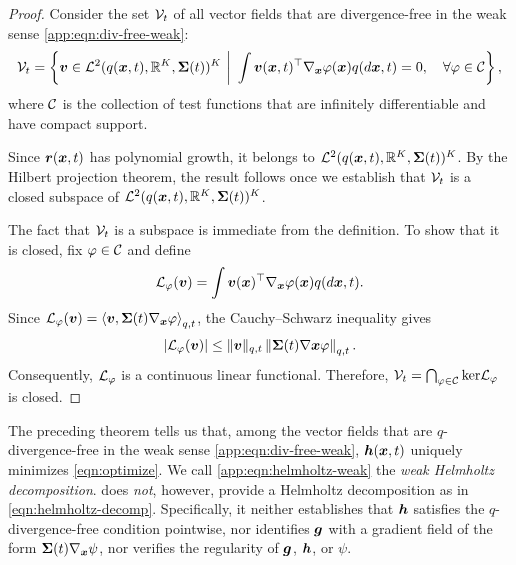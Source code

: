 \begin{proof}
    Consider the set $\mathcal{V}_t$ of all vector fields that are divergence-free in the weak sense \cref{app:eqn:div-free-weak}:
    \begin{equation}\label{app:eqn:weak-subspace}
    \cV_t = \left\{ \mbv \in  \cL^2(q(\mbx, t), \bbR^K, \mbSigma(t))^K \ \bigg| \  \int \mbv(\mbx, t)^\top \nabla_{\mbx} \varphi(\mbx) q(d\mbx, t) = 0, \quad \forall \varphi \in \cC \right\},
    \end{equation}
    where $\mathcal{C}$ is the collection of test functions that are infinitely differentiable and have compact support.

    Since $\boldsymbol{r}(\boldsymbol{x}, t)$ has polynomial growth, it belongs to $\mathcal{L}^2(q(\boldsymbol{x}, t), \mathbb{R}^K, \boldsymbol{\Sigma}(t))^K$.
    By the Hilbert projection theorem, the result follows once we establish that $\mathcal{V}_t$ is a closed subspace of $\mathcal{L}^2(q(\boldsymbol{x}, t), \mathbb{R}^K, \boldsymbol{\Sigma}(t))^K$. 
   
    The fact that $\mathcal{V}_t$ is a subspace is immediate from the definition. To show that it is closed, fix $\varphi \in \mathcal{C}$ and define
    \begin{equation*}
    \mathcal{L}_\varphi(\boldsymbol{v}) =  \int \boldsymbol{v}(\boldsymbol{x})^\top\nabla_{\boldsymbol{x}}\varphi(\boldsymbol{x}) q(d\boldsymbol{x},t).
    \end{equation*}
Since $\mathcal{L}_\varphi(\boldsymbol{v}) = \left\langle \boldsymbol{v}, \boldsymbol{\Sigma}(t)\nabla_{\boldsymbol{x}}\varphi \right\rangle_{q, t}$, the Cauchy--Schwarz inequality gives
\begin{equation*}
|\mathcal{L}_\varphi(\boldsymbol{v})| \leq \|\boldsymbol{v} \|_{q, t} \left\| \boldsymbol{\Sigma}(t)\nabla{\boldsymbol{x}}\varphi \right\|_{q, t}.
\end{equation*}
Consequently, $\mathcal{L}_{\varphi}$ is a continuous linear functional.
Therefore, $\mathcal{V}_t = \bigcap_{\varphi\in \mathcal{C}}
\mathrm{ker} \mathcal{L}_{\varphi}$ is closed.
\end{proof}

The preceding theorem tells us that, among the vector fields that are $q$-divergence-free in the weak sense \cref{app:eqn:div-free-weak}, $\boldsymbol{h}(\boldsymbol{x},t)$ uniquely minimizes \cref{eqn:optimize}.
We call \cref{app:eqn:helmholtz-weak} the \emph{weak Helmholtz decomposition}.
 does \emph{not}, however, provide a Helmholtz decomposition as in \cref{eqn:helmholtz-decomp}.
Specifically, it neither establishes that $\boldsymbol{h}$ satisfies the $q$-divergence-free condition pointwise, nor identifies $\boldsymbol{g}$ with a gradient field of the form $\boldsymbol{\Sigma}(t)\nabla_{\boldsymbol{x}}\psi$, nor verifies the regularity of $\boldsymbol{g}$, $\boldsymbol{h}$, or $\psi$.

